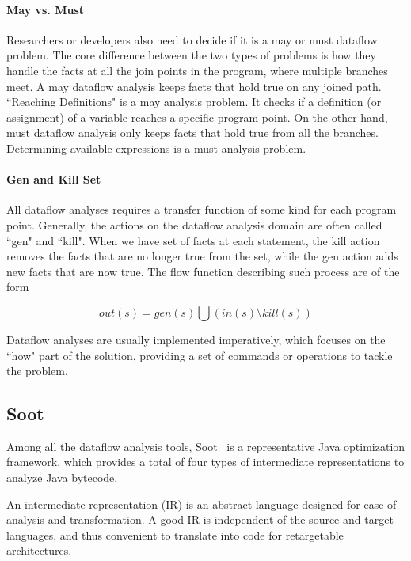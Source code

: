 \paragraph{May vs. Must} Researchers or developers also need to decide if it is a may or must dataflow problem. The core difference between the two types of problems is how they handle the facts at all the join points in the program, where multiple branches meet. A may dataflow analysis keeps facts that hold true on any joined path. ``Reaching Definitions" is a may analysis problem. It checks if a definition (or assignment) of a variable reaches a specific program point. On the other hand, must dataflow analysis only keeps facts that hold true from all the branches. Determining available expressions is a must analysis problem.

\paragraph{Gen and Kill Set} All dataflow analyses requires a transfer function of some kind for each program point. Generally, the actions on the dataflow analysis domain are often called ``gen" and ``kill". When we have set of facts at each statement, the kill action removes the facts that are no longer true from the set, while the gen action adds new facts that are now true. The flow function describing such process are of the form

\begin{equation}
out(s) = gen(s) \bigcup (in(s)  \setminus  kill(s))
\end{equation}

Dataflow analyses are usually implemented imperatively, which focuses on the ``how" part of the solution, providing a set of commands or operations to tackle the problem.

\subsection{Soot}

Among all the dataflow analysis tools, Soot~\cite{Vallee-Rai:1999:SJB:781995.782008} is a representative Java optimization framework, which provides a total of four types of intermediate representations to analyze Java bytecode. 

An intermediate representation (IR) is an abstract language designed for ease of analysis and transformation. A good IR is independent of the source and target languages, and thus convenient to translate into code for retargetable architectures.

